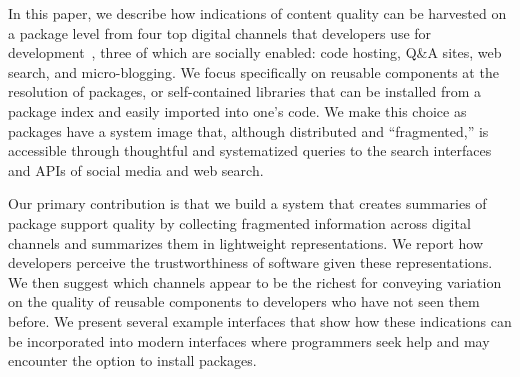 In this paper, we describe how indications of content quality can be harvested on a package level from four top digital channels that developers use for development~\cite{storey_revolution_2014}, three of which are socially enabled: code hosting, Q\&A sites, web search, and micro-blogging.
We focus specifically on reusable components at the resolution of packages, or self-contained libraries that can be installed from a package index and easily imported into one's code.
We make this choice as packages have a system image that, although distributed and ``fragmented,'' is accessible through thoughtful and systematized queries to the search interfaces and APIs of social media and web search.

Our primary contribution is that we build a system that creates summaries of package support quality by collecting fragmented information across digital channels and summarizes them in lightweight representations.
We report how developers perceive the trustworthiness of software given these representations.
We then suggest which channels appear to be the richest for conveying variation on the quality of reusable components to developers who have not seen them before.
We present several example interfaces that show how these indications can be incorporated into modern interfaces where programmers seek help and may encounter the option to install packages.


